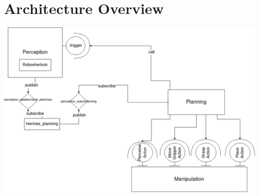\documentclass[main.tex]{subfiles}
\begin{document}
	\begingroup
	\renewcommand{\cleardoublepage}{}
	\renewcommand{\clearpage}{}
	\chapter{Architecture Overview}
	
	
  	\includegraphics[width=\textwidth, ]{images/architecture.png}		  	
	\endgroup
\end{document}
